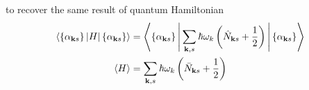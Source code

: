 \documentclass[../../../main.tex]{subfiles}
\begin{document}
to recover the same result of quantum Hamiltonian
\begin{align*}
  \braket{\left\{ \alpha_{\mathbf{k }s} \right\} |H|\left\{ \alpha_{\mathbf{k }s} \right\} }
   & =
  \left\langle \left\{ \alpha_{\mathbf{k }s} \right\} \Bigg| \sum_{\mathbf{k},s} \hbar \omega_k \left( \hat{N }_{\mathbf{k} s }+ \frac{1 }{2} \right)\Bigg|\left\{ \alpha_{\mathbf{k }s} \right\}  \right\rangle \\
  \braket{H}
   & =  \sum_{\mathbf{k},s} \hbar \omega_k \left( \bar{N}_{\mathbf{k }s} +\frac{1 }{2} \right)
\end{align*}
\end{document}

